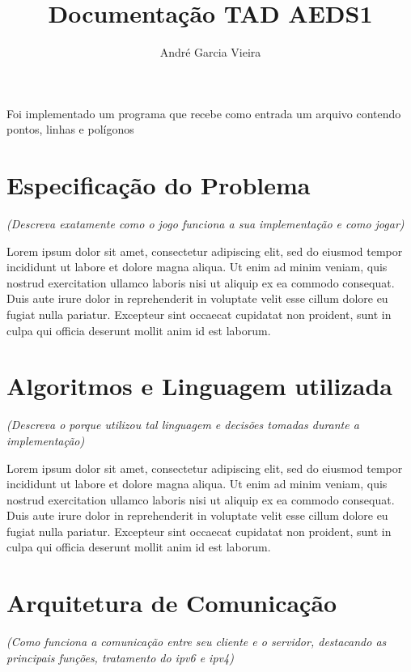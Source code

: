 \documentclass[12pt]{article}
\title{Documentação TAD AEDS1}
\author{André Garcia Vieira\inst{1}}
\begin{document}
 

\maketitle

\begin{resumo}
Foi implementado um programa que recebe como entrada um arquivo contendo pontos, linhas e polígonos
\end{resumo}

\section{Especificação do Problema}

\textit{(Descreva exatamente como o jogo funciona a sua implementação e como jogar)}

Lorem ipsum dolor sit amet, consectetur adipiscing elit, sed do eiusmod tempor incididunt ut labore et dolore magna aliqua. Ut enim ad minim veniam, quis nostrud exercitation ullamco laboris nisi ut aliquip ex ea commodo consequat. Duis aute irure dolor in reprehenderit in voluptate velit esse cillum dolore eu fugiat nulla pariatur. Excepteur sint occaecat cupidatat non proident, sunt in culpa qui officia deserunt mollit anim id est laborum.

\section{Algoritmos e Linguagem utilizada}

\textit{(Descreva o porque utilizou tal linguagem e decisões tomadas durante a implementação)}

Lorem ipsum dolor sit amet, consectetur adipiscing elit, sed do eiusmod tempor incididunt ut labore et dolore magna aliqua. Ut enim ad minim veniam, quis nostrud exercitation ullamco laboris nisi ut aliquip ex ea commodo consequat. Duis aute irure dolor in reprehenderit in voluptate velit esse cillum dolore eu fugiat nulla pariatur. Excepteur sint occaecat cupidatat non proident, sunt in culpa qui officia deserunt mollit anim id est laborum.

\section{Arquitetura de Comunicação}

\textit{(Como funciona a comunicação entre seu cliente e o servidor, destacando as principais funções, tratamento do ipv6 e ipv4)}
\end{document}
